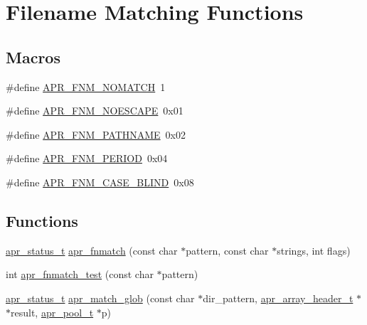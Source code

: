\hypertarget{group__apr__fnmatch}{\section{Filename Matching Functions}
\label{group__apr__fnmatch}
}
\subsection*{Macros}
\begin{DoxyCompactItemize}
\item 
\#define \hyperlink{group__apr__fnmatch_gaea769621807400e4c741e7deddf6c3df}{A\-P\-R\-\_\-\-F\-N\-M\-\_\-\-N\-O\-M\-A\-T\-C\-H}~1
\item 
\#define \hyperlink{group__apr__fnmatch_gae12c1286631f316647be6dc007170630}{A\-P\-R\-\_\-\-F\-N\-M\-\_\-\-N\-O\-E\-S\-C\-A\-P\-E}~0x01
\item 
\#define \hyperlink{group__apr__fnmatch_ga0d421a2cef68cb590f958b5de6c7fe1b}{A\-P\-R\-\_\-\-F\-N\-M\-\_\-\-P\-A\-T\-H\-N\-A\-M\-E}~0x02
\item 
\#define \hyperlink{group__apr__fnmatch_ga4806f936b6eacc59dfed831d67b750ef}{A\-P\-R\-\_\-\-F\-N\-M\-\_\-\-P\-E\-R\-I\-O\-D}~0x04
\item 
\#define \hyperlink{group__apr__fnmatch_ga5cee1c0a917a283a193721d11160b502}{A\-P\-R\-\_\-\-F\-N\-M\-\_\-\-C\-A\-S\-E\-\_\-\-B\-L\-I\-N\-D}~0x08
\end{DoxyCompactItemize}
\subsection*{Functions}
\begin{DoxyCompactItemize}
\item 
\hyperlink{group__apr__errno_gaf76ee4543247e9fb3f3546203e590a6c}{apr\-\_\-status\-\_\-t} \hyperlink{group__apr__fnmatch_gabe9c7d7efe6afc203a01befbc45bad96}{apr\-\_\-fnmatch} (const char $\ast$pattern, const char $\ast$strings, int flags)
\item 
int \hyperlink{group__apr__fnmatch_ga4e7828bb7be756d999f13b8af8202204}{apr\-\_\-fnmatch\-\_\-test} (const char $\ast$pattern)
\item 
\hyperlink{group__apr__errno_gaf76ee4543247e9fb3f3546203e590a6c}{apr\-\_\-status\-\_\-t} \hyperlink{group__apr__fnmatch_ga25c7eacaa966d0c9c09ef160644ac997}{apr\-\_\-match\-\_\-glob} (const char $\ast$dir\-\_\-pattern, \hyperlink{structapr__array__header__t}{apr\-\_\-array\-\_\-header\-\_\-t} $\ast$$\ast$result, \hyperlink{group__apr__pools_gaf137f28edcf9a086cd6bc36c20d7cdfb}{apr\-\_\-pool\-\_\-t} $\ast$p)
\end{DoxyCompactItemize}


